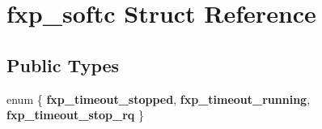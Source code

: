 \hypertarget{structfxp__softc}{}\section{fxp\+\_\+softc Struct Reference}
\label{structfxp__softc}
\subsection*{Public Types}
\begin{DoxyCompactItemize}
\item 
\mbox{\label{structfxp__softc_a1f3eafdb12394551cda01247959eb170}} 
enum \{ {\bfseries fxp\+\_\+timeout\+\_\+stopped}, 
{\bfseries fxp\+\_\+timeout\+\_\+running}, 
{\bfseries fxp\+\_\+timeout\+\_\+stop\+\_\+rq}
 \}
\end{DoxyCompactItemize}
